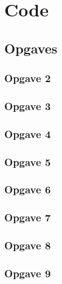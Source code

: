 \documentclass[11pt, a4paper, titlepage, openright]{article}
\begin{document}
	

\onecolumn
\appendix
\appendixpage
\addappheadtotoc

\section{Code}
	\subsection{Opgaves}
		\subsubsection{Opgave 2}
			
			
		\bigskip
		\subsubsection{Opgave 3}
			
		\bigskip
		\subsubsection{Opgave 4}
			
			
		\bigskip
		\subsubsection{Opgave 5}
			
		\bigskip
		\subsubsection{Opgave 6}
			
			
		\bigskip
		\subsubsection{Opgave 7}
			
		\bigskip
		\subsubsection{Opgave 8}
			
		\bigskip
		\subsubsection{Opgave 9}
			
		\bigskip
\end{document}
